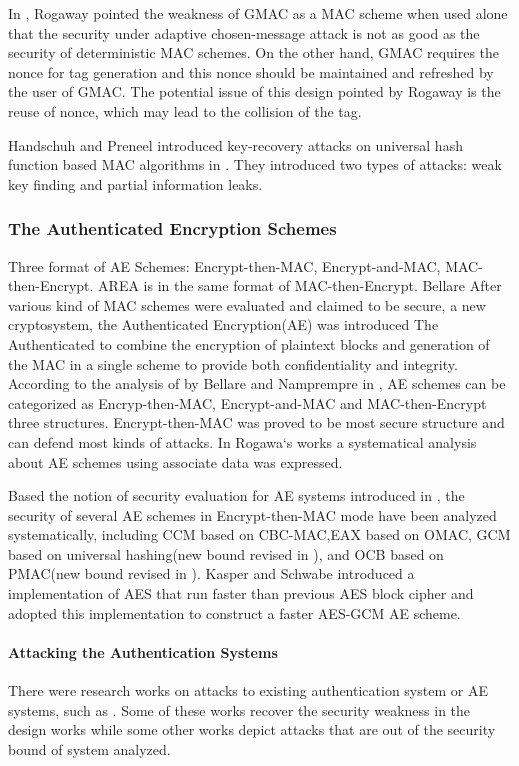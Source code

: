\documentclass{article}
\begin{document}
In \cite{Rogaway2011}, Rogaway pointed the weakness of GMAC as a MAC scheme when used alone that the security under adaptive chosen-message attack is not as good as the security of deterministic MAC schemes. On the other hand, GMAC requires the nonce for tag generation and this nonce should be maintained and refreshed by the user of GMAC. The potential issue of this design pointed by Rogaway is the reuse of nonce, which may lead to the collision of the tag. 

Handschuh and Preneel introduced key-recovery attacks on universal hash function based MAC algorithms in \cite{key_recover}. They introduced two types of attacks: weak key finding and partial information leaks.

\subsubsection{The Authenticated Encryption Schemes}
Three format of AE Schemes: Encrypt-then-MAC, Encrypt-and-MAC, MAC-then-Encrypt. AREA is in the same format of MAC-then-Encrypt. 
Bellare 
After various kind of MAC schemes were evaluated and claimed to be secure, a new cryptosystem, the Authenticated Encryption(AE) was introduced The Authenticated to combine the encryption of
plaintext blocks and generation of the MAC in a single scheme to provide both
confidentiality and integrity. According to the analysis of by Bellare and Namprempre in \cite{keylist}, AE schemes can be categorized as Encryp-then-MAC, Encrypt-and-MAC and MAC-then-Encrypt three structures. Encrypt-then-MAC was proved to be most secure structure and can defend most kinds of attacks. 
In Rogawa`s works \cite{aead} a systematical analysis about AE
schemes using associate data was expressed.  

Based the notion of security evaluation for AE systems introduced in \cite{aead}, the security of several AE schemes in
Encrypt-then-MAC mode have been analyzed systematically, including CCM \cite{ccm}based on
CBC-MAC,EAX\cite{eax} based on OMAC, GCM
\cite{gcm} based on universal hashing(new bound revised in \cite{breaking}), and
OCB\cite{ocb} based on PMAC(new bound revised in \cite{tweak,iPMAC}). Kasper and
Schwabe introduced a implementation of AES that run faster than previous AES block cipher
and adopted this implementation to construct a faster AES-GCM AE
scheme\cite{fast}.

\paragraph{Attacking the Authentication Systems}
There were research works on attacks to existing authentication system or AE systems, such as
\cite{cycle,attack_blk,hardware_attack}. Some of these works recover the security weakness in the design works while some other works depict attacks that are out of the security bound of system analyzed. 
\end{document}
